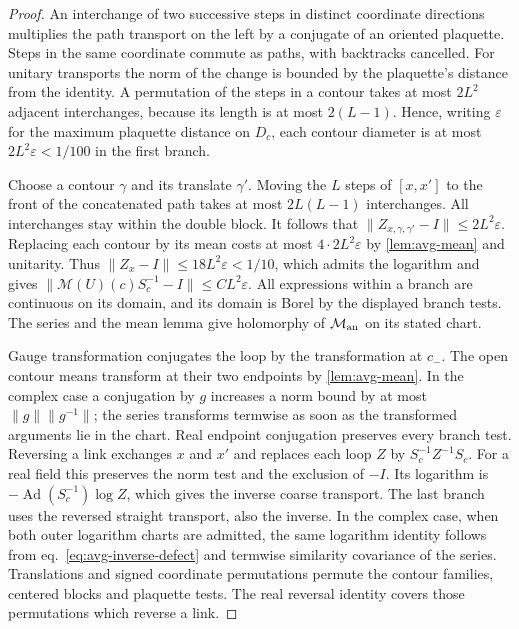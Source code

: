 \documentclass[11pt,letterpaper,reqno]{amsart}
\numberwithin{equation}{section}
\renewcommand{\eqref}[1]{\textup{eq.~\ref{#1}}}
\theoremstyle{definition}
\theoremstyle{remark}
\begin{document}
\begin{proof}
An interchange of two successive steps in distinct coordinate
directions multiplies the path transport on the left by a conjugate
of an oriented plaquette. Steps in the same coordinate commute as
paths, with backtracks cancelled.
For unitary transports the norm of the change is bounded by the
plaquette's distance from the identity. A permutation of the steps
in a contour takes at most \(2L^2\) adjacent interchanges, because
its length is at most \(2(L-1)\). Hence, writing \(\varepsilon\) for the
maximum plaquette distance on \(D_c\), each contour diameter is at
most \(2L^2\varepsilon<1/100\) in the first branch.

Choose a contour \(\gamma\) and its translate \(\gamma'\). Moving
the \(L\) steps of \([x,x']\) to the front of the concatenated path
takes at most \(2L(L-1)\) interchanges. All interchanges stay within
the double block. It follows that
\(\|Z_{x,\gamma,\gamma'}-I\|\leq2L^2\varepsilon\).
Replacing each contour by its mean costs at most \(4\cdot2L^2\varepsilon\)
by \cref{lem:avg-mean} and unitarity. Thus
\(\|Z_x-I\|\leq18L^2\varepsilon<1/10\), which admits the
logarithm and gives \(\|\mathcal M(U)(c)S_c^{-1}-I\|\leq
C L^2\varepsilon\). All expressions within a branch are continuous
on its domain, and its domain is Borel by the displayed branch tests.
The series and the mean lemma give holomorphy of
\(\mathcal M_{\rm an}\) on its stated chart.

Gauge transformation conjugates the loop by the transformation at
\(c_-\). The open contour means transform at their two endpoints
by \cref{lem:avg-mean}. In the complex case a conjugation by \(g\)
increases a norm bound by at most \(\|g\|\|g^{-1}\|\); the series
transforms termwise as soon as the transformed arguments lie in the
chart. Real endpoint conjugation preserves every branch test. Reversing
a link exchanges \(x\) and \(x'\) and replaces each loop \(Z\)
by \(S_c^{-1}Z^{-1}S_c\). For a real field this preserves the
norm test and the exclusion of \(-I\). Its logarithm is
\(-\operatorname{Ad}(S_c^{-1})\log Z\), which gives the inverse
coarse transport. The last branch uses the reversed straight
transport, also the inverse. In the complex case, when both
outer logarithm charts are admitted, the same logarithm identity
follows from \eqref{eq:avg-inverse-defect} and termwise similarity
covariance of the series. Translations and signed coordinate
permutations permute the contour families, centered blocks and
plaquette tests. The real reversal identity covers those
permutations which reverse a link.


\end{proof}
\end{document}
